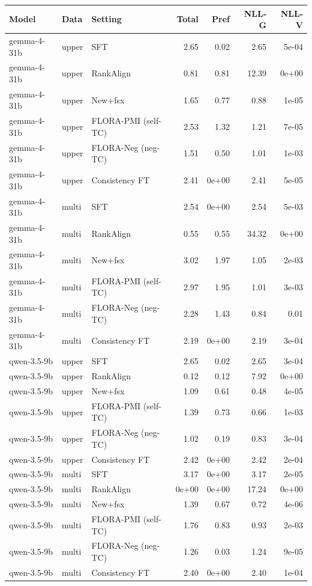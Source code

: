 \begin{tabular}{lll rrrr}
\toprule
Model & Data & Setting & Total & Pref & NLL-G & NLL-V \\
\midrule
gemma-4-31b & upper & SFT & 2.65 & 0.02 & 2.65 & 5e-04 \\
gemma-4-31b & upper & RankAlign & 0.81 & 0.81 & 12.39 & 0e+00 \\
gemma-4-31b & upper & New+fsx & 1.65 & 0.77 & 0.88 & 1e-05 \\
gemma-4-31b & upper & FLORA-PMI (self-TC) & 2.53 & 1.32 & 1.21 & 7e-05 \\
gemma-4-31b & upper & FLORA-Neg (neg-TC) & 1.51 & 0.50 & 1.01 & 1e-03 \\
gemma-4-31b & upper & Consistency FT & 2.41 & 0e+00 & 2.41 & 5e-05 \\
\midrule
gemma-4-31b & multi & SFT & 2.54 & 0e+00 & 2.54 & 5e-03 \\
gemma-4-31b & multi & RankAlign & 0.55 & 0.55 & 34.32 & 0e+00 \\
gemma-4-31b & multi & New+fsx & 3.02 & 1.97 & 1.05 & 2e-03 \\
gemma-4-31b & multi & FLORA-PMI (self-TC) & 2.97 & 1.95 & 1.01 & 3e-03 \\
gemma-4-31b & multi & FLORA-Neg (neg-TC) & 2.28 & 1.43 & 0.84 & 0.01 \\
gemma-4-31b & multi & Consistency FT & 2.19 & 0e+00 & 2.19 & 3e-04 \\
\midrule
qwen-3.5-9b & upper & SFT & 2.65 & 0.02 & 2.65 & 3e-04 \\
qwen-3.5-9b & upper & RankAlign & 0.12 & 0.12 & 7.92 & 0e+00 \\
qwen-3.5-9b & upper & New+fsx & 1.09 & 0.61 & 0.48 & 4e-05 \\
qwen-3.5-9b & upper & FLORA-PMI (self-TC) & 1.39 & 0.73 & 0.66 & 1e-03 \\
qwen-3.5-9b & upper & FLORA-Neg (neg-TC) & 1.02 & 0.19 & 0.83 & 3e-04 \\
qwen-3.5-9b & upper & Consistency FT & 2.42 & 0e+00 & 2.42 & 2e-04 \\
\midrule
qwen-3.5-9b & multi & SFT & 3.17 & 0e+00 & 3.17 & 2e-05 \\
qwen-3.5-9b & multi & RankAlign & 0e+00 & 0e+00 & 17.24 & 0e+00 \\
qwen-3.5-9b & multi & New+fsx & 1.39 & 0.67 & 0.72 & 4e-06 \\
qwen-3.5-9b & multi & FLORA-PMI (self-TC) & 1.76 & 0.83 & 0.93 & 2e-03 \\
qwen-3.5-9b & multi & FLORA-Neg (neg-TC) & 1.26 & 0.03 & 1.24 & 9e-05 \\
qwen-3.5-9b & multi & Consistency FT & 2.40 & 0e+00 & 2.40 & 1e-04 \\
\bottomrule
\end{tabular}

